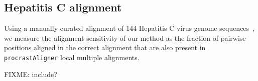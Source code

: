 \documentclass[twoside,11pt]{article}
\begin{document}
\begin{comment}
\begin{table}[t]
\begin{center}
\begin{tabular}{|l|c|c|c|c|c|c|c|c|}
\hline  &\multicolumn{2}{|c|}{Sequence} &\multicolumn{3}{|c|}{Pattern} &\multicolumn{3}{|c|}{Found}  \\
\hline Method & Accession & length(Kb) & Id & length(bp) & copies &  Sn \% & T (s) & k\\ 
\hline procrast   & - & 22 & M1 & 96 & 110 & 99.0 & 120 & 11 \\
          & - & 22 & M2 & 96 & 110 & 99.0 & 120 & 11 \\
   
\hline EulerAlign & - & 22 & M1 & 96 & 110 & 99.0 & 120 & 11 \\
          & - & 22 & M2 & 96 & 110 & 99.0 & 120 & 11 \\

\hline

\end{tabular}

\caption{Results}
\label{tab-results}
\end{center}
\end{table}
\end{comment}

\subsection{Hepatitis C alignment}
Using a manually curated alignment of 144
Hepatitis C virus genome sequences~\cite{ref-hcvdb}, we measure the
alignment sensitivity of our method as the fraction of pairwise
positions aligned in the correct alignment that are also present in
\texttt{procrastAligner} local multiple alignments.

FIXME: include?
\end{document}
